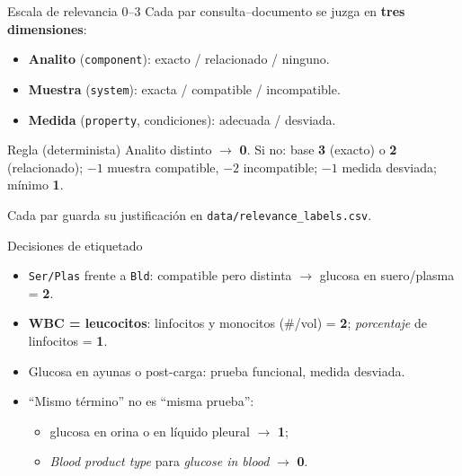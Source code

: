 \documentclass{beamer}
\newcommand{\rel}[1]{\textbf{#1}}
\newcommand{\code}[1]{\texttt{#1}}
\begin{document}
\begin{frame}{Escala de relevancia 0--3}
    Cada par consulta--documento se juzga en \textbf{tres dimensiones}:
    \begin{itemize}
        \item \textbf{Analito} (\code{component}): exacto / relacionado / ninguno.
        \item \textbf{Muestra} (\code{system}): exacta / compatible / incompatible.
        \item \textbf{Medida} (\code{property}, condiciones): adecuada / desviada.
    \end{itemize}
    \begin{block}{Regla (determinista)}
        \small Analito distinto $\rightarrow$ \rel{0}. Si no: base \rel{3} (exacto) o \rel{2} (relacionado);
        $-1$ muestra compatible, $-2$ incompatible; $-1$ medida desviada; mínimo \rel{1}.
    \end{block}
    \small Cada par guarda su justificación en \code{data/relevance\_labels.csv}.

\end{frame}

\begin{frame}{Decisiones de etiquetado}
    \begin{itemize}
        \item \code{Ser/Plas} frente a \code{Bld}: compatible pero distinta $\rightarrow$ glucosa en suero/plasma = \rel{2}.
        \item \textbf{WBC = leucocitos}: linfocitos y monocitos (\#/vol) = \rel{2}; \emph{porcentaje} de linfocitos = \rel{1}.
        \item Glucosa en ayunas o post-carga: prueba funcional, medida desviada.
        \item ``Mismo término'' no es ``misma prueba'':
        \begin{itemize}
            \item glucosa en orina o en líquido pleural $\rightarrow$ \rel{1};
            \item \emph{Blood product type} para \emph{glucose in blood} $\rightarrow$ \rel{0}.
        \end{itemize}
    \end{itemize}

\end{frame}
\end{document}
